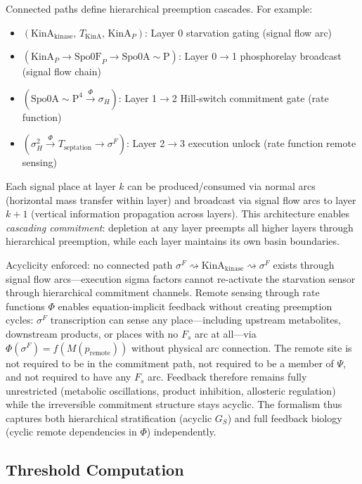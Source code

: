 \documentclass[10pt,letterpaper]{article}
\begin{document}
\vspace{3pt}
\noindent Connected paths define hierarchical preemption cascades. For example:
\begin{itemize}
\item $(\text{KinA}_{\text{kinase}},\, T_{\text{KinA}},\, \text{KinA}_P)$: Layer 0 starvation gating (signal flow arc)
\item $(\text{KinA}_P \to \text{Spo0F}_P \to \text{Spo0A}{\sim}\text{P})$: Layer 0$\rightarrow$1 phosphorelay broadcast (signal flow chain)
\item $(\text{Spo0A}{\sim}\text{P}^4 \xrightarrow{\Phi} \sigma_H)$: Layer 1$\rightarrow$2 Hill-switch commitment gate (rate function)
\item $(\sigma_H^2 \xrightarrow{\Phi} T_{\text{septation}} \to \sigma^F)$: Layer 2$\rightarrow$3 execution unlock (rate function remote sensing)
\end{itemize}
Each signal place at layer $k$ can be produced/consumed via normal arcs (horizontal mass transfer within layer) and broadcast via signal flow arcs to layer $k+1$ (vertical information propagation across layers). This architecture enables \textit{cascading commitment}: depletion at any layer preempts all higher layers through hierarchical preemption, while each layer maintains its own basin boundaries.

Acyclicity enforced: no connected path $\sigma^F \rightsquigarrow \text{KinA}_{\text{kinase}} \rightsquigarrow \sigma^F$ exists through signal flow arcs---execution sigma factors cannot re-activate the starvation sensor through hierarchical commitment channels. Remote sensing through rate functions $\Phi$ enables equation-implicit feedback without creating preemption cycles: $\sigma^F$ transcription can sense any place---including upstream metabolites, downstream products, or places with no $F_s$ arc at all---via $\Phi(\sigma^F) = f(M(p_{\text{remote}}))$ without physical arc connection. The remote site is not required to be in the commitment path, not required to be a member of $\Psi$, and not required to have any $F_s$ arc. Feedback therefore remains fully unrestricted (metabolic oscillations, product inhibition, allosteric regulation) while the irreversible commitment structure stays acyclic. The formalism thus captures both hierarchical stratification (acyclic $G_S$) and full feedback biology (cyclic remote dependencies in $\Phi$) independently.

\subsection{Threshold Computation}
\end{document}
